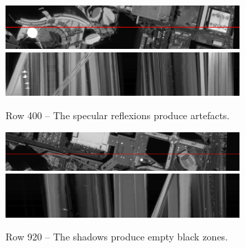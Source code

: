 \documentclass{article}
\def\epiWidth{0.8}
\theoremstyle{definition}
\begin{document}
\begin{figure}[ht]
  \centering
  \includegraphics[width=\epiWidth\textwidth]{1519991772641_1st.png}\\
  \includegraphics[width=\epiWidth\textwidth]{1519991772641_epi.png}
  \caption{Row 400 -- The specular reflexions produce artefacts.}
\end{figure}


\begin{figure}[ht]
  \centering
  \includegraphics[width=\epiWidth\textwidth]{1519992108606_1st.png}\\
  \includegraphics[width=\epiWidth\textwidth]{1519992108606_epi.png}
  \caption{Row 920 -- The shadows produce empty black zones.}
\end{figure}


\clearpage


\end{document}
